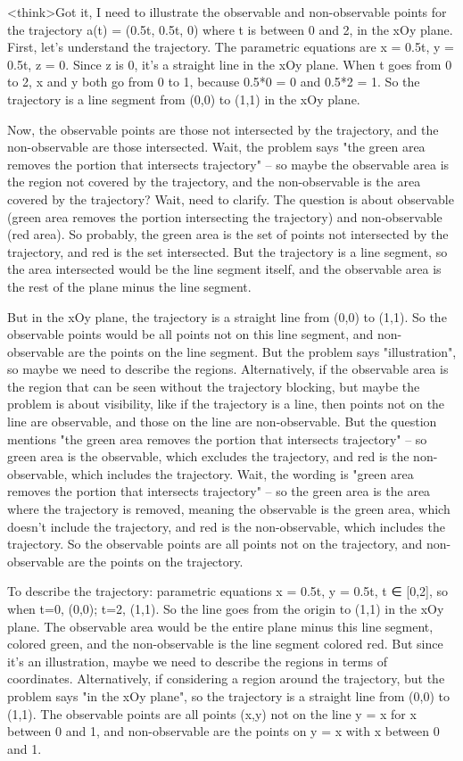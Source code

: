 <think>Got it, I need to illustrate the observable and non-observable points for the trajectory a(t) = (0.5t, 0.5t, 0) where t is between 0 and 2, in the xOy plane. First, let's understand the trajectory. The parametric equations are x = 0.5t, y = 0.5t, z = 0. Since z is 0, it's a straight line in the xOy plane. When t goes from 0 to 2, x and y both go from 0 to 1, because 0.5*0 = 0 and 0.5*2 = 1. So the trajectory is a line segment from (0,0) to (1,1) in the xOy plane.

Now, the observable points are those not intersected by the trajectory, and the non-observable are those intersected. Wait, the problem says "the green area removes the portion that intersects trajectory" – so maybe the observable area is the region not covered by the trajectory, and the non-observable is the area covered by the trajectory? Wait, need to clarify. The question is about observable (green area removes the portion intersecting the trajectory) and non-observable (red area). So probably, the green area is the set of points not intersected by the trajectory, and red is the set intersected. But the trajectory is a line segment, so the area intersected would be the line segment itself, and the observable area is the rest of the plane minus the line segment.

But in the xOy plane, the trajectory is a straight line from (0,0) to (1,1). So the observable points would be all points not on this line segment, and non-observable are the points on the line segment. But the problem says "illustration", so maybe we need to describe the regions. Alternatively, if the observable area is the region that can be seen without the trajectory blocking, but maybe the problem is about visibility, like if the trajectory is a line, then points not on the line are observable, and those on the line are non-observable. But the question mentions "the green area removes the portion that intersects trajectory" – so green area is the observable, which excludes the trajectory, and red is the non-observable, which includes the trajectory. Wait, the wording is "green area removes the portion that intersects trajectory" – so the green area is the area where the trajectory is removed, meaning the observable is the green area, which doesn't include the trajectory, and red is the non-observable, which includes the trajectory. So the observable points are all points not on the trajectory, and non-observable are the points on the trajectory.

To describe the trajectory: parametric equations x = 0.5t, y = 0.5t, t ∈ [0,2], so when t=0, (0,0); t=2, (1,1). So the line goes from the origin to (1,1) in the xOy plane. The observable area would be the entire plane minus this line segment, colored green, and the non-observable is the line segment colored red. But since it's an illustration, maybe we need to describe the regions in terms of coordinates. Alternatively, if considering a region around the trajectory, but the problem says "in the xOy plane", so the trajectory is a straight line from (0,0) to (1,1). The observable points are all points (x,y) not on the line y = x for x between 0 and 1, and non-observable are the points on y = x with x between 0 and 1.

